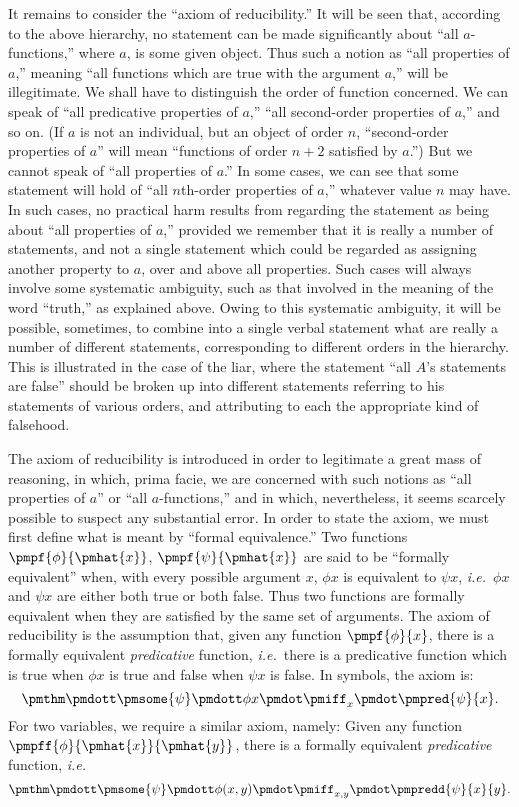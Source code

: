 \documentclass[letterpaper,12pt,openany,leqno]{book}
\newcommand{\pagefirst}[1]{\marginnote[\boxed{\text{#1}}]{\boxed{\text{#1}}}}
\begin{document}
It remains to consider the ``axiom of reducibility.'' It will be seen that, according to the above hierarchy, no statement can be made significantly about ``all $a$-functions,'' where $a$, is some given object. Thus such a notion as ``all properties of $a$,'' meaning ``all functions which are true with the argument $a$,'' will be illegitimate. We shall have to distinguish the order of function concerned. We can speak of ``all predicative properties of $a$,'' ``all second-order properties of $a$,'' and so on. (If $a$ is not an individual, but an object of order $n$, ``second-order properties of $a$'' will mean ``functions of order $n+2$ satisfied by $a$.'') But we cannot speak of ``all properties of $a$.'' In some cases, we can see that some statement will hold of ``all $n$th-order properties of $a$,'' whatever value $n$ may have. In such cases, no practical harm results from regarding the statement as being about ``all properties of $a$,'' provided we remember that it is really a number of statements, and not a single statement which could be regarded as assigning another property to $a$, over and above all properties. Such cases will always involve some systematic ambiguity, such as that involved in the meaning of the word ``truth,'' as explained above. Owing to this systematic ambiguity, it will be possible, sometimes, to combine into a single verbal statement what are really a number of different statements, corresponding to different orders in the hierarchy. This is illustrated in the case of the liar, where the statement ``all $A$'s statements are false'' should be broken up into different statements referring to his statements of various orders, and attributing to each the appropriate kind of falsehood.

The axiom of reducibility is introduced in order to legitimate a great mass of reasoning, in which, prima facie, we are concerned with such notions as ``all properties of $a$'' or ``all $a$-functions,'' and in which, nevertheless, it seems scarcely possible to suspect any substantial error. In order to state the axiom, we must first define what is meant by ``formal equivalence.'' Two functions $\pmpf{\phi}{\pmhat{x}}$, $\pmpf{\psi}{\pmhat{x}}$ are said to be ``formally equivalent'' when, with every possible argument $x$, $\phi x$ is equivalent to $\psi x$, \textit{i.e.}\ $\phi x$ and $\psi x$ are either both true or both false. Thus two functions are formally equivalent when they are satisfied by the same set of arguments. The axiom of reducibility is the assumption that, given any function $\pmpf{\phi}{x}$, there is a formally equivalent \textit{predicative} function, \pagefirst{59} \textit{i.e.}\ there is a predicative function which is true when $\phi x$ is true and false when $\psi x$ is false. In symbols, the axiom is:
\[
	\pmthm \pmdott \pmsome{\psi}\pmdott \phi x \pmdot \pmiff_x \pmdot \pmpred{\psi}{x}.
\]
For two variables, we require a similar axiom, namely: Given any function $\pmpff{\phi}{\pmhat{x}}{\pmhat{y}}$, there is a formally equivalent \textit{predicative} function, \textit{i.e.}\
\[
	\pmthm \pmdott \pmsome{\psi}\pmdott \phi (x,y) \pmdot \pmiff_{x,y} \pmdot \pmpredd{\psi}{x}{y}.
\]
\end{document}
